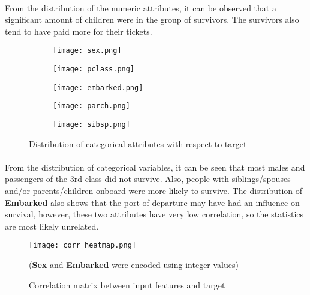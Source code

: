 \documentclass{article}
\begin{document}
\paragraph{}From the distribution of the numeric attributes, it can be observed that a significant amount of children were in the group of survivors. The survivors also tend to have paid more for their tickets.
\newpage
\begin{figure}[htb]
    \centering
    \begin{subfigure}
        \centering
        \texttt{[image: sex.png]}
    \end{subfigure}
    \begin{subfigure}
        \centering
        \texttt{[image: pclass.png]}
    \end{subfigure}
    \begin{subfigure}
        \centering
        \texttt{[image: embarked.png]}
    \end{subfigure}
    \begin{subfigure}
        \centering
        \texttt{[image: parch.png]}
    \end{subfigure}
    \begin{subfigure}
        \centering
        \texttt{[image: sibsp.png]}
    \end{subfigure}
    \caption{Distribution of categorical attributes with respect to target}
    \label{fig:enter-label}
\end{figure}

\paragraph{}From the distribution of categorical variables, it can be seen that most males and passengers of the 3rd class did not survive. Also, people with siblings/spouses and/or parents/children onboard were more likely to survive. The distribution of \textbf{Embarked} also shows that the port of departure may have had an influence on survival, however, these two attributes have very low correlation, so the statistics are most likely unrelated.
\newpage
\begin{figure}[htb]
    \centering
    \texttt{[image: corr\_heatmap.png]}
    \caption{Correlation matrix between input features and target}
    \small{(\textbf{Sex} and \textbf{Embarked} were encoded using integer values)}
    \label{fig:enter-label}
\end{figure}
\end{document}
